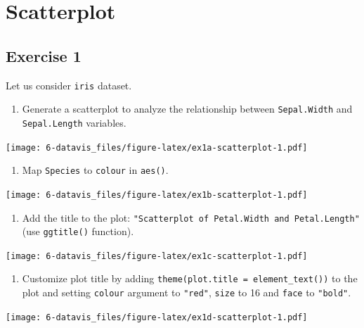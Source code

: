\documentclass[]{book}
\providecommand{\tightlist}{%
  \setlength{\itemsep}{0pt}\setlength{\parskip}{0pt}}
\def\tightlist{}
\begin{document}
\clearpage

\section{Scatterplot}\label{scatterplot}

\subsection{Exercise 1}\label{exercise-1-13}

Let us consider \texttt{iris} dataset.

\begin{enumerate}
\def\labelenumi{\alph{enumi}.}
\tightlist
\item
  Generate a scatterplot to analyze the relationship between
  \texttt{Sepal.Width} and \texttt{Sepal.Length} variables.
\end{enumerate}

\texttt{[image: 6-datavis\_files/figure-latex/ex1a-scatterplot-1.pdf]}

\begin{enumerate}
\def\labelenumi{\alph{enumi}.}
\setcounter{enumi}{1}
\tightlist
\item
  Map \texttt{Species} to \texttt{colour} in \texttt{aes()}.
\end{enumerate}

\texttt{[image: 6-datavis\_files/figure-latex/ex1b-scatterplot-1.pdf]}

\begin{enumerate}
\def\labelenumi{\alph{enumi}.}
\setcounter{enumi}{2}
\tightlist
\item
  Add the title to the plot:
  \texttt{"Scatterplot\ of\ Petal.Width\ and\ Petal.Length"} (use
  \texttt{ggtitle()} function).
\end{enumerate}

\texttt{[image: 6-datavis\_files/figure-latex/ex1c-scatterplot-1.pdf]}

\begin{enumerate}
\def\labelenumi{\alph{enumi}.}
\setcounter{enumi}{3}
\tightlist
\item
  Customize plot title by adding
  \texttt{theme(plot.title\ =\ element\_text())} to the plot and setting
  \texttt{colour} argument to \texttt{"red"}, \texttt{size} to 16 and
  \texttt{face} to \texttt{"bold"}.
\end{enumerate}

\texttt{[image: 6-datavis\_files/figure-latex/ex1d-scatterplot-1.pdf]}
\end{document}
